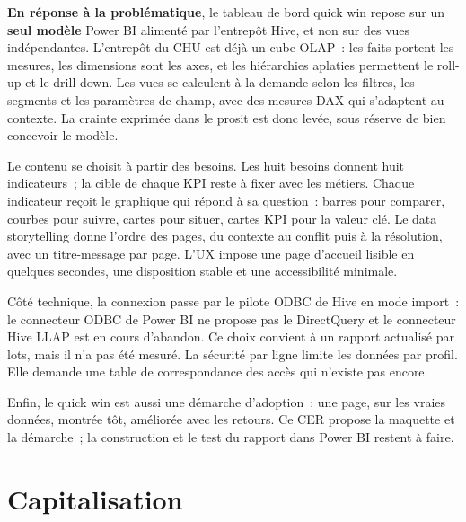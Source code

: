 \noindent \textbf{En réponse à la problématique}, le tableau de bord quick win repose sur un \textbf{seul modèle} Power BI alimenté par l'entrepôt Hive, et non sur des vues indépendantes. L'entrepôt du CHU est déjà un cube OLAP~: les faits portent les mesures, les dimensions sont les axes, et les hiérarchies aplaties permettent le roll-up et le drill-down. Les vues se calculent à la demande selon les filtres, les segments et les paramètres de champ, avec des mesures DAX qui s'adaptent au contexte. La crainte exprimée dans le prosit est donc levée, sous réserve de bien concevoir le modèle.

\vspace{0.2cm}

\noindent Le contenu se choisit à partir des besoins. Les huit besoins donnent huit indicateurs~; la cible de chaque KPI reste à fixer avec les métiers. Chaque indicateur reçoit le graphique qui répond à sa question~: barres pour comparer, courbes pour suivre, cartes pour situer, cartes KPI pour la valeur clé. Le data storytelling donne l'ordre des pages, du contexte au conflit puis à la résolution, avec un titre-message par page. L'UX impose une page d'accueil lisible en quelques secondes, une disposition stable et une accessibilité minimale.

\vspace{0.2cm}

\noindent Côté technique, la connexion passe par le pilote ODBC de Hive en mode import~: le connecteur ODBC de Power BI ne propose pas le DirectQuery et le connecteur Hive LLAP est en cours d'abandon. Ce choix convient à un rapport actualisé par lots, mais il n'a pas été mesuré. La sécurité par ligne limite les données par profil. Elle demande une table de correspondance des accès qui n'existe pas encore.

\vspace{0.2cm}

\noindent Enfin, le quick win est aussi une démarche d'adoption~: une page, sur les vraies données, montrée tôt, améliorée avec les retours. Ce CER propose la maquette et la démarche~; la construction et le test du rapport dans Power BI restent à faire.

\section*{Capitalisation}
{}

